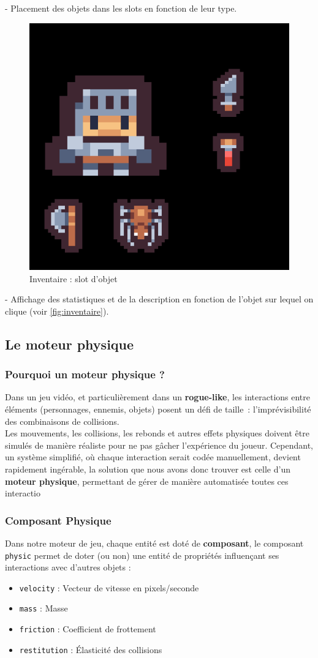 \documentclass[a4paper,11pt]{article}
\begin{document}
   - Placement des objets dans les slots en fonction de leur type.

\begin{figure}[h]
    \centering 
    \includegraphics[width=0.2\linewidth]{./img/itemslot.png} 
    \caption{Inventaire : slot d'objet} 
\end{figure}

   - Affichage des statistiques et de la description en fonction de l'objet sur lequel on clique (voir \autoref{fig:inventaire}).


\newpage

\subsection{Le moteur physique}

\subsubsection{Pourquoi un moteur physique ?}
\label{sec:moteur_physique}
Dans un jeu vidéo, et particulièrement dans un \textbf{rogue-like}, les interactions entre éléments (personnages, ennemis, objets) posent un défi de taille~: l'imprévisibilité des combinaisons de collisions. \\
Les mouvements, les collisions, les rebonds et autres effets physiques doivent être simulés de manière réaliste pour ne pas gâcher l’expérience du joueur. Cependant, un système simplifié, où chaque interaction serait codée manuellement, devient rapidement ingérable, la solution que nous avons donc trouver est celle d'un \textbf{moteur physique}, permettant de gérer de manière automatisée toutes ces interactio

\subsubsection{Composant Physique}
\label{sec:structure_donnees}
Dans notre moteur de jeu, chaque entité est doté de \textbf{composant}, le composant \texttt{physic} permet de doter (ou non) une entité de propriétés influençant ses interactions avec d’autres objets :
\begin{itemize}
    \item \texttt{velocity} : Vecteur de vitesse en pixels/seconde
    \item \texttt{mass} : Masse
    \item \texttt{friction} : Coefficient de frottement
    \item \texttt{restitution} : Élasticité des collisions
\end{itemize}
\end{document}

